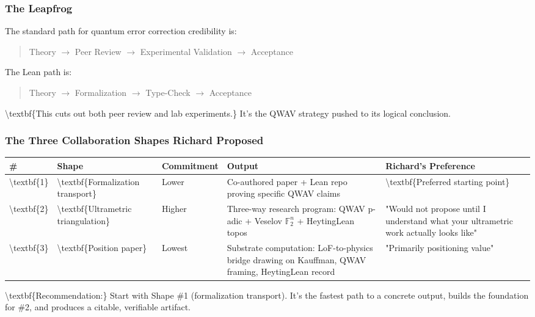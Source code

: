 \documentclass[11pt,a4paper]{article}
\begin{document}
\subsubsection{The Leapfrog}


The standard path for quantum error correction credibility is:
\begin{quote}
Theory $\to$ Peer Review $\to$ Experimental Validation $\to$ Acceptance
\end{quote}


The Lean path is:
\begin{quote}
Theory $\to$ Formalization $\to$ Type-Check $\to$ Acceptance
\end{quote}


\textbackslash{}textbf\{This cuts out both peer review and lab experiments.\} It's the QWAV strategy pushed to its logical conclusion.

\subsubsection{The Three Collaboration Shapes Richard Proposed}


\begin{tabular}{|l|l|l|l|l|}
\hline
\textbf{\#} & \textbf{Shape} & \textbf{Commitment} & \textbf{Output} & \textbf{Richard's Preference} \\
\hline
\textbackslash{}textbf\{1\} & \textbackslash{}textbf\{Formalization transport\} & Lower & Co-authored paper + Lean repo proving specific QWAV claims & \textbackslash{}textbf\{Preferred starting point\} \\
\hline
\textbackslash{}textbf\{2\} & \textbackslash{}textbf\{Ultrametric triangulation\} & Higher & Three-way research program: QWAV p-adic + Veselov $\mathbb{F}_2^n$ + HeytingLean topos & "Would not propose until I understand what your ultrametric work actually looks like" \\
\hline
\textbackslash{}textbf\{3\} & \textbackslash{}textbf\{Position paper\} & Lowest & Substrate computation: LoF-to-physics bridge drawing on Kauffman, QWAV framing, HeytingLean record & "Primarily positioning value" \\
\hline
\end{tabular}


\textbackslash{}textbf\{Recommendation:\} Start with Shape \#1 (formalization transport). It's the fastest path to a concrete output, builds the foundation for \#2, and produces a citable, verifiable artifact.

\hrulefill
\end{document}
